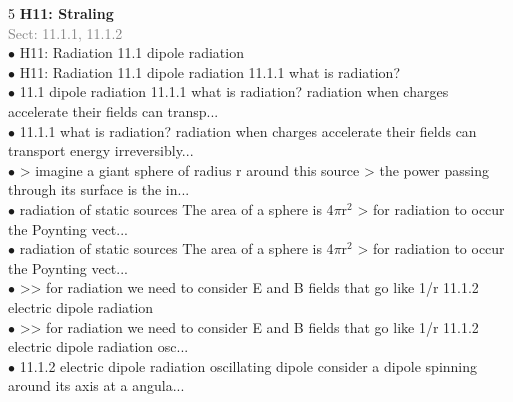 \documentclass[7pt,a4paper]{article}
\begin{document}
\begin{multicols*}{5}
\textbf{H11: Straling}\\\textcolor{gray}{{Sect: 11.1.1, 11.1.2}}\\\vspace{0.5pt}
$\bullet$ H11: Radiation
11.1 dipole radiation\\
$\bullet$ H11: Radiation
11.1 dipole radiation
11.1.1 what is radiation?\\
$\bullet$ 11.1 dipole radiation
11.1.1 what is radiation?
radiation when charges accelerate their fields can transp...\\
$\bullet$ 11.1.1 what is radiation?
radiation when charges accelerate their fields can transport energy irreversibly...\\
$\bullet$ > imagine a giant sphere of radius r around this source
 > the power passing through its surface is the in...\\
$\bullet$ radiation of static sources The area of a sphere is 4$\pi$r$^2$
> for radiation to occur the Poynting vect...\\
$\bullet$ radiation of static sources The area of a sphere is 4$\pi$r$^2$
> for radiation to occur the Poynting vect...\\
$\bullet$ >> for radiation we need to consider E and B fields that go like 1/r
11.1.2 electric dipole radiation\\
$\bullet$ >> for radiation we need to consider E and B fields that go like 1/r
11.1.2 electric dipole radiation
osc...\\
$\bullet$ 11.1.2 electric dipole radiation
oscillating dipole consider a dipole spinning around its axis at a angula...\\
\columnbreak


\end{multicols*}
\end{document}
